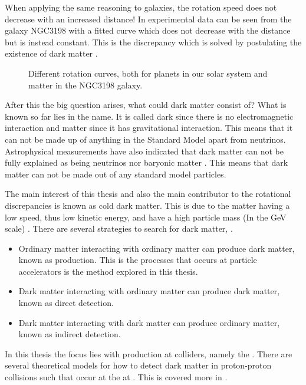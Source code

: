 When applying the same reasoning to galaxies, the rotation speed does not decrease with an increased distance! In  experimental data can be seen from the galaxy NGC3198 with a fitted curve which does not decrease with the distance but is instead constant.  This is the discrepancy which is solved by postulating the existence of dark matter \citep{1933AcHPh}.
 \begin{figure}[h] %
    \hfill
    \caption{Different rotation curves, both for planets in our solar system and matter in the NGC3198 galaxy.}
    \label{fig:rotation}
  \end{figure}
After this the big question arises, what could dark matter consist of? What is known so far lies in the name. It is called dark since there is no electromagnetic interaction and matter since it has gravitational interaction. This means that it can not be made up of anything in the Standard Model apart from neutrinos. Astrophysical measurements have also indicated that dark matter can not be fully explained as being neutrinos nor baryonic matter \citep{Gondolo:2003}. This means that dark matter can not be made out of any standard model particles. 

The main interest of this thesis and also the main contributor to the rotational discrepancies is known as cold dark matter. This is due to the matter having a low speed, thus low kinetic energy, and have a high particle mass (In the GeV scale) \citep{Goodman:2010,CERN-PH-EP-2012-210,Jungman:1996}.
There are several strategies to search for dark matter, \citep{Jungman:1996}.
\begin{itemize}
\item Ordinary matter interacting with ordinary matter can produce dark matter, known as production. This is the processes that occurs at particle accelerators is the method explored in this thesis.
\item Dark matter interacting with ordinary matter can produce dark matter, known as direct detection.
\item Dark matter interacting with dark matter can produce ordinary matter, known as indirect detection.
\end{itemize} 
In this thesis the focus lies with production at colliders, namely the \abbrLHC . There are several theoretical models for how to detect dark matter in proton-proton collisions such that occur at the \abbrLHC at \abbrCERN. This is covered more in . 

